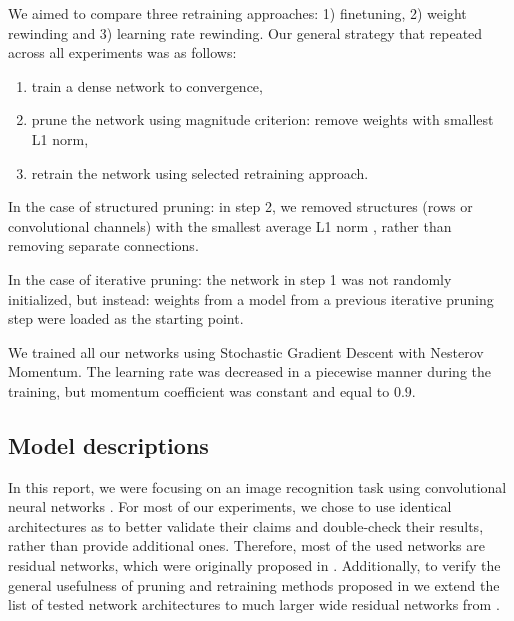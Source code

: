 
We aimed to compare three retraining approaches: 1) finetuning, 2) weight rewinding and 3) learning rate rewinding. Our general strategy that repeated across all experiments was as follows:
\begin{enumerate}
    \item train a dense network to convergence,
    \item prune the network using magnitude criterion: remove weights with smallest L1 norm,
    \item retrain the network using selected retraining approach.
\end{enumerate}

In the case of structured pruning: in step 2, we removed structures (rows or convolutional channels) with the smallest average L1 norm \cite{structured}, rather than removing separate connections. 

In the case of iterative pruning: the network in step 1 was not randomly initialized, but instead: weights from a model from a previous iterative pruning step were loaded as the starting point.

We trained all our networks using Stochastic Gradient Descent with Nesterov Momentum. The learning rate was decreased in a piecewise manner during the training, but momentum coefficient was constant and equal to $0.9$.

\subsection{Model descriptions}

In this report, we were focusing on an image recognition task using convolutional neural networks \cite{lecun_convnet}. 
For most of our experiments, we chose to use identical architectures as \cite{Renda} to better validate their claims and double-check their results, rather than provide additional ones.
Therefore, most of the used networks are residual networks, which were originally proposed in \cite{resnet}.
Additionally, to verify the general usefulness of pruning and retraining methods proposed in \cite{Renda} we extend the list of tested network architectures to much larger wide residual networks from \cite{wrn}.

